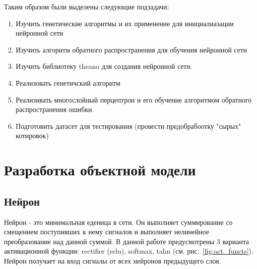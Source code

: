 \documentclass[a4paper,12pt]{article}
\begin{document}
\par Таким образом были выделены следующие подзадачи:
\begin{enumerate}
\item Изучить генетические алгоритмы и их применение для инициалиазации нейронной сети
\item Изучить алгоритм обратного распространения для обучения нейронной сети
\item Изучить библиотеку theano для создания нейронной сети.
\item Реализовать генетичский алгоритм
\item Реализивать многослойный перцептрон и его обучение алгоритмом обратного распространения ошибки.
\item Подготовить датасет для тестирования (провести предобрабоотку "сырых" котировок)
\end{enumerate}

\newpage\section{Разработка объектной модели}

\subsection{Нейрон}
Нейрон - это минимальная еденица в сети. Он выполняет суммирование со смещением поступивших к нему сигналов и выполняет нелинейное преобразование над данной суммой. В данной работе предусмотрены 3 варианта активационной функции: rectifier (relu), softmax, tahn (см. рис.~\ref{fig:act_functs}). Нейрон получает на вход сигналы от всех нейронов предыдущего слоя.
\end{document}
